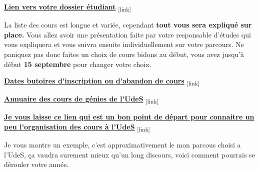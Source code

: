 \bigbreak
\href{https://www.usherbrooke.ca/helios/lib880/dosetu/menu_offert.htm}{\textbf{Lien vers votre dossier étudiant}}\textsubscript{  [link]}
\bigbreak

 La liste des cours est longue et variée, cependant \textbf{tout vous sera expliqué sur place.} Vous allez avoir une présentation faite par votre responsable d’études qui vous expliquera et vous suivra ensuite individuellement sur votre parcours. Ne paniquez pas donc faites un choix de cours bidons au début, vous avez jusqu'à début \textbf{15 septembre} pour changer votre choix.

 \bigbreak
 \href{Annexes/Sherbrooke/Date_Limite.pdf}{\textbf{Dates butoires d'inscription ou d'abandon de cours}}\textsubscript{  [link]}
 \bigbreak

\bigbreak
\href{Annexes/Sherbrooke/Annuaire_Genie_Electrique.pdf}{\textbf{Annuaire des cours de génies de l'UdeS}}\textsubscript{  [link]}
\bigbreak

\href{https://www.usherbrooke.ca/admission/programme/620/maitrise-en-genie-electrique/}{\textbf{Je vous laisse ce lien qui est un bon point de départ pour connaitre un peu l'organisation des cours à l'UdeS}}\textsubscript{  [link]}
\bigbreak

Je vous montre un exemple, c'est approximativement le mon parcous choisi a l'UdeS, ça vaudra surement mieux qu'un long discours, voici comment pourrais se dérouler votre année.

